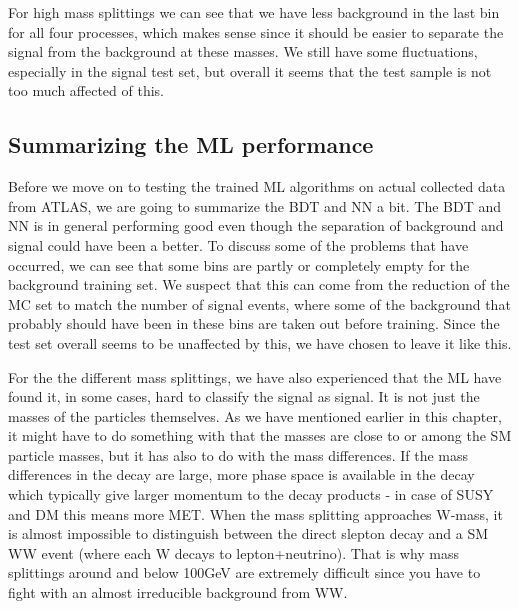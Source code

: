 For high mass splittings we can see that we have less background in the last bin for all four processes, which makes sense since it should be easier to separate the signal from the background at these masses. We still have some fluctuations, especially in the signal test set, but overall it seems that the test sample is not too much affected of this. 







\subsection{Summarizing the ML performance}
\label{sec:summary_ML}
Before we move on to testing the trained ML algorithms on actual collected data from ATLAS, we are going to summarize the BDT and NN a bit. The BDT and NN is in general performing good even though the separation of background and signal could have been a better. To discuss some of the problems that have occurred, we can see that some bins are partly or completely empty for the background training set. We suspect that this can come from the reduction of the MC set to match the number of signal events, where some of the background that probably should have been in these bins are taken out before training. Since the test set overall seems to be unaffected by this, we have chosen to leave it like this.

For the the different mass splittings, we have also experienced that the ML have found it, in some cases, hard to classify the signal as signal. It is not just the masses of the particles themselves. As we have mentioned earlier in this chapter, it might have to do something with that the masses are close to or among the SM particle masses, but it has also to do with the mass differences. If the mass differences in the decay are large, more phase space is available in the decay which typically give larger momentum to the decay products - in case of SUSY and DM this means more MET. When the mass splitting approaches W-mass, it is almost impossible to distinguish between the direct slepton decay and a SM WW event (where each W decays to lepton+neutrino). That is why mass splittings around and below 100GeV are extremely difficult since you have to fight with an almost irreducible background from WW. 











